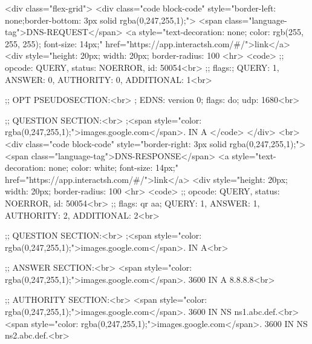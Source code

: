 \begin{rawhtml}
<div class="flex-grid">
            <div class="code block-code" style="border-left: none;border-bottom: 3px solid rgba(0,247,255,1);">
                <span class="language-tag">DNS-REQUEST</span>
                <a style="text-decoration: none; color: rgb(255, 255, 255); font-size: 14px;" href="https://app.interactsh.com/#/">link</a>
                <div style="height: 20px; width: 20px; border-radius: 100%
                <hr>
                <code>
                    ;; opcode: QUERY, status: NOERROR, id: 50054<br>
                    ;; flags:; QUERY: 1, ANSWER: 0, AUTHORITY: 0, ADDITIONAL: 1<br>

                    ;; OPT PSEUDOSECTION:<br>
                    ; EDNS: version 0; flags: do; udp: 1680<br>

                    ;; QUESTION SECTION:<br>
                    ;<span style="color: rgba(0,247,255,1);">images.google.com</span>.	IN	 A
                </code>
            </div>
        <br>
            <div class="code block-code" style="border-right: 3px solid rgba(0,247,255,1);">
                <span class="language-tag">DNS-RESPONSE</span>
                <a style="text-decoration: none; color: white; font-size: 14px;" href="https://app.interactsh.com/#/">link</a>
                <div style="height: 20px; width: 20px; border-radius: 100%
                <hr>
                <code>
                    ;; opcode: QUERY, status: NOERROR, id: 50054<br>
                    ;; flags: qr aa; QUERY: 1, ANSWER: 1, AUTHORITY: 2, ADDITIONAL: 2<br>

                    ;; QUESTION SECTION:<br>
                    ;<span style="color: rgba(0,247,255,1);">images.google.com</span>.	IN	 A<br>

                    ;; ANSWER SECTION:<br>
                    <span style="color: rgba(0,247,255,1);">images.google.com</span>.	3600	IN	A	8.8.8.8<br>

                    ;; AUTHORITY SECTION:<br>
                    <span style="color: rgba(0,247,255,1);">images.google.com</span>.	3600	IN	NS	ns1.abc.def.<br>
                    <span style="color: rgba(0,247,255,1);">images.google.com</span>.	3600	IN	NS	ns2.abc.def.<br>


\end{rawhtml}
